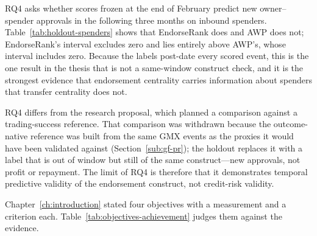 
RQ4 asks whether scores frozen at the end of February predict new owner--spender approvals in the following three months on inbound spenders. Table~\ref{tab:holdout-spenders} shows that EndorseRank does and AWP does not; EndorseRank's interval excludes zero and lies entirely above AWP's, whose interval includes zero. Because the labels post-date every scored event, this is the one result in the thesis that is not a same-window construct check, and it is the strongest evidence that endorsement centrality carries information about spenders that transfer centrality does not.

RQ4 differs from the research proposal, which planned a comparison against a trading-success reference. That comparison was withdrawn because the outcome-native reference was built from the same GMX events as the proxies it would have been validated against (Section~\ref{sub:gf-pr}); the holdout replaces it with a label that is out of window but still of the same construct---new approvals, not profit or repayment. The limit of RQ4 is therefore that it demonstrates temporal predictive validity of the endorsement construct, not credit-risk validity.


Chapter~\ref{ch:introduction} stated four objectives with a measurement and a criterion each. Table~\ref{tab:objectives-achievement} judges them against the evidence.

\begin{table}[htbp]
\centering
\caption{Research objectives, the criterion stated in Chapter~\ref{ch:introduction}, and the outcome.}
\label{tab:objectives-achievement}
\end{table}

